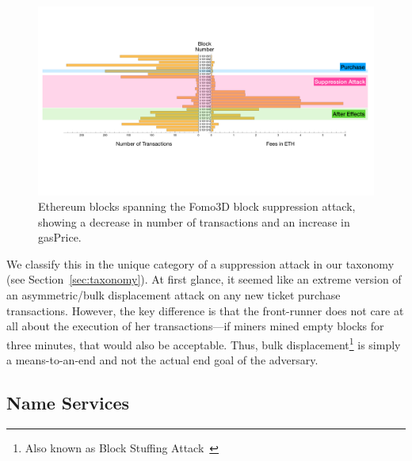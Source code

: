 \begin{figure}[t]
    \centering
    \includegraphics[width=1\linewidth]{figures/fomo3d.pdf}
    \caption[Fomo3d impact on network transaction volume and gas usage]{Ethereum blocks spanning the Fomo3D block suppression attack, showing a decrease in number of transactions and an increase in gasPrice.}
    \label{fig:fomo3d}
\end{figure}

We classify this in the unique category of a suppression attack in our taxonomy (see Section~\ref{sec:taxonomy}). At first glance, it seemed like an extreme version of an asymmetric/bulk displacement attack on any new ticket purchase transactions. However, the key difference is that the front-runner does not care at all about the execution of her transactions---if miners mined empty blocks for three minutes, that would also be acceptable. Thus, bulk displacement\footnote{Also known as Block Stuffing Attack~\cite{blockstuffing18}} is simply a means-to-an-end and not the actual end goal of the adversary.


\subsection{Name Services}\label{sec:ens}

